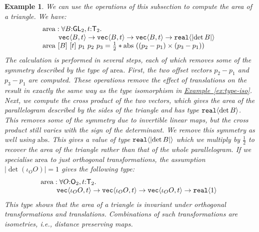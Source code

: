 \documentclass{sigplanconf}
\newcommand{\abs}[1]{\lvert #1 \rvert}
\newcommand{\SynGL}[1]{\mathsf{GL}_#1}
\newcommand{\SynOrth}[1]{\mathsf{O}_#1}
\newcommand{\SynTransl}[1]{\mathsf{T}_#1}
\newcommand{\tyPrim}[2]{\textup{\texttt{#1}}\langle #2 \rangle}
\newcommand{\exref}[1]{\hyperref[#1]{Example~\ref*{#1}}}
\theoremstyle{examplestyle}
\newtheorem{example}{Example}
\theoremstyle{restatementstyle}
\begin{document}
\begin{example}\label{ex:area-of-triangle-1}
  We can use the operations of this subsection to
  compute the area of a triangle. We have:
  \begin{displaymath}
    \begin{array}{@{}l}
      \mathrm{area} : \forall B\mathord:\SynGL{2},
      t\mathord:\SynTransl{2}.\ \\
      \hspace{0.8cm}\tyPrim{vec}{B, t} \to \tyPrim{vec}{B, t} \to
      \tyPrim{vec}{B, t} \to \tyPrim{real}{\abs{\det B}}
      \\ \mathrm{area}\ [B]\ [t]\ p_1\ p_2\ p_3 = \frac{1}{2} *
      \mathrm{abs}\ ((p_2 - p_1) \times (p_3 - p_1))
    \end{array}
  \end{displaymath}
  The calculation is performed in several steps, each of which removes
  some of the symmetry described by the type of
  $\mathrm{area}$. First, the two offset vectors $p_2 - p_1$ and $p_3
  - p_1$ are computed. These operations remove the effect of
  translations on the result in exactly the same way as the type
  isomorphism in \exref{ex:type-iso}. Next, we compute the cross
  product of the two vectors, which gives the area of the
  parallelogram described by the sides of the triangle and has type
  $\tyPrim{real}{\det B}$. This removes some of the symmetry due to
  invertible linear maps, but the cross product still varies with the
  sign of the determinant. We remove this symmetry as well using
  $\mathrm{abs}$. This gives a value of type $\tyPrim{real}{\abs{\det B}}$
  which we multiply by $\frac{1}{2}$ to recover the area of the
  triangle rather than that of the whole parallelogram. If we
  specialise $\mathrm{area}$ to just orthogonal transformations, the
  assumption $|\det (\iota_OO)| = 1$ gives the following type:
  \begin{displaymath}
    \begin{array}{@{}l}
      \mathrm{area} : \forall O\mathord:\SynOrth{2},
      t\mathord:\SynTransl{2}.\ \\
      \hspace{0.8cm}\tyPrim{vec}{\iota_OO, t} \to
      \tyPrim{vec}{\iota_OO, t} \to \tyPrim{vec}{\iota_OO, t} \to
      \tyPrim{real}{1}
    \end{array}
  \end{displaymath}
  This type shows that the area of a triangle is invariant under
  orthogonal transformations and translations. Combinations of such
  transformations are {\em isometries}, i.e., distance preserving
  maps.
\end{example}
\end{document}
